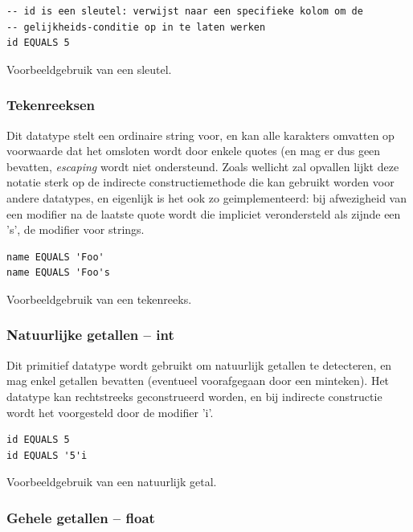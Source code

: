 \begin{code}
\begin{verbatim}
-- id is een sleutel: verwijst naar een specifieke kolom om de
-- gelijkheids-conditie op in te laten werken
id EQUALS 5
\end{verbatim}
\caption{Voorbeeldgebruik van een sleutel.}
\end{code}

\subsubsection{Tekenreeksen}

Dit datatype stelt een ordinaire string voor, en kan alle karakters omvatten op voorwaarde dat het omsloten wordt door enkele quotes (en mag er dus geen bevatten, \emph{escaping} wordt niet ondersteund. Zoals wellicht zal opvallen lijkt deze notatie sterk op de indirecte constructiemethode die kan gebruikt worden voor andere datatypes, en eigenlijk is het ook zo geimplementeerd: bij afwezigheid van een modifier na de laatste quote wordt die impliciet verondersteld als zijnde een 's', de modifier voor strings.

\begin{code}
\begin{verbatim}
name EQUALS 'Foo'
name EQUALS 'Foo's
\end{verbatim}
\caption{Voorbeeldgebruik van een tekenreeks.}
\end{code}

\subsubsection{Natuurlijke getallen -- int}

Dit primitief datatype wordt gebruikt om natuurlijk getallen te detecteren, en mag enkel getallen bevatten (eventueel voorafgegaan door een minteken). Het datatype kan rechtstreeks geconstrueerd worden, en bij indirecte constructie wordt het voorgesteld door de modifier 'i'.

\begin{code}
\begin{verbatim}
id EQUALS 5
id EQUALS '5'i
\end{verbatim}
\caption{Voorbeeldgebruik van een natuurlijk getal.}
\end{code}

\subsubsection{Gehele getallen -- float}

